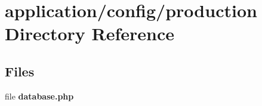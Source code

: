 \section{application/config/production Directory Reference}
\label{dir_06d49afa9885f32f45fc52b5b8f8a0e1}
\subsection*{Files}
\begin{DoxyCompactItemize}
\item 
file {\bf database.\-php}
\end{DoxyCompactItemize}
